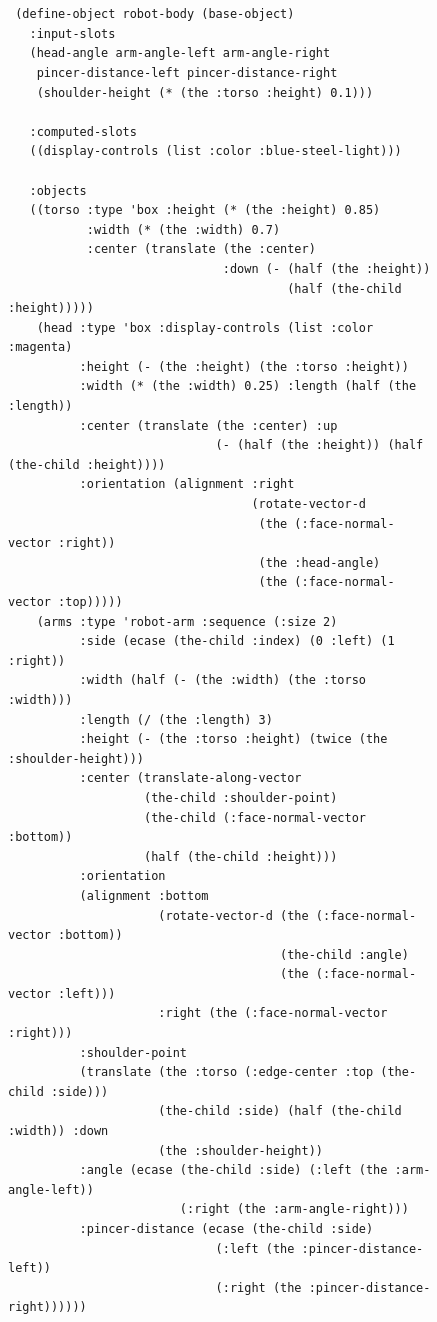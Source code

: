 \documentclass [11pt]{book}
\begin{document}
\begin{figure}
\begin{lrbox}{\boxedverb}
\begin{minipage}{\linewidth}
\small{

\begin{verbatim}


 (define-object robot-body (base-object)
   :input-slots
   (head-angle arm-angle-left arm-angle-right
    pincer-distance-left pincer-distance-right
    (shoulder-height (* (the :torso :height) 0.1)))

   :computed-slots
   ((display-controls (list :color :blue-steel-light)))

   :objects
   ((torso :type 'box :height (* (the :height) 0.85)
           :width (* (the :width) 0.7)
           :center (translate (the :center) 
                              :down (- (half (the :height)) 
                                       (half (the-child :height)))))
    (head :type 'box :display-controls (list :color :magenta)
          :height (- (the :height) (the :torso :height))
          :width (* (the :width) 0.25) :length (half (the :length))
          :center (translate (the :center) :up
                             (- (half (the :height)) (half (the-child :height))))
          :orientation (alignment :right
                                  (rotate-vector-d 
                                   (the (:face-normal-vector :right))
                                   (the :head-angle)
                                   (the (:face-normal-vector :top)))))
    (arms :type 'robot-arm :sequence (:size 2)
          :side (ecase (the-child :index) (0 :left) (1 :right))
          :width (half (- (the :width) (the :torso :width)))
          :length (/ (the :length) 3)
          :height (- (the :torso :height) (twice (the :shoulder-height)))
          :center (translate-along-vector 
                   (the-child :shoulder-point)
                   (the-child (:face-normal-vector :bottom)) 
                   (half (the-child :height)))
          :orientation 
          (alignment :bottom
                     (rotate-vector-d (the (:face-normal-vector :bottom))
                                      (the-child :angle)
                                      (the (:face-normal-vector :left)))
                     :right (the (:face-normal-vector :right)))
          :shoulder-point 
          (translate (the :torso (:edge-center :top (the-child :side)))
                     (the-child :side) (half (the-child :width)) :down
                     (the :shoulder-height))
          :angle (ecase (the-child :side) (:left (the :arm-angle-left))
                        (:right (the :arm-angle-right)))
          :pincer-distance (ecase (the-child :side) 
                             (:left (the :pincer-distance-left))
                             (:right (the :pincer-distance-right))))))
      

\end{verbatim}}
\end{minipage}
\end{lrbox}
\end{figure}
\end{document}
